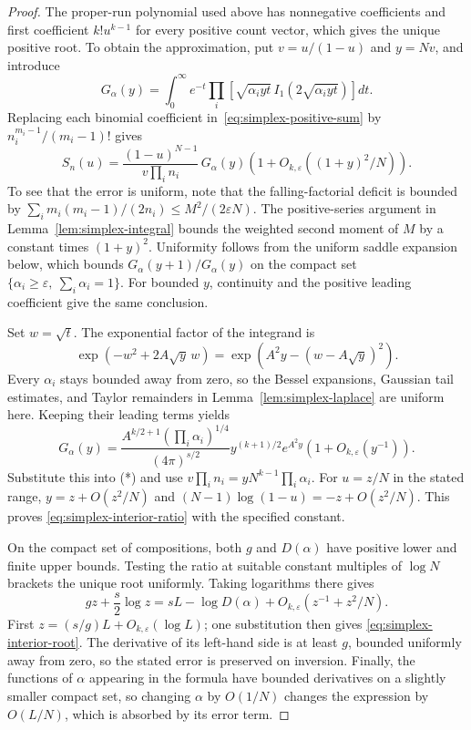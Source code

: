 \begin{proof}
The proper-run polynomial used above has nonnegative coefficients and
first coefficient $k!u^{k-1}$ for every positive count vector, which gives
the unique positive root. To obtain the approximation, put
$v=u/(1-u)$ and $y=Nv$, and introduce
\[
G_{\alpha}(y)=\int_0^\infty e^{-t}
\prod_i\left[\sqrt{\alpha_i y t}\,
I_1(2\sqrt{\alpha_i y t})\right]dt.
\]
Replacing each binomial coefficient in~\eqref{eq:simplex-positive-sum}
by $n_i^{m_i-1}/(m_i-1)!$ gives
\[
S_n(u)=\frac{(1-u)^{N-1}}{v\prod_i n_i}\,G_{\alpha}(y)
\left(1+O_{k,\varepsilon}((1+y)^2/N)\right).
\tag{*}
\]
To see that the error is uniform, note that the falling-factorial deficit
is bounded by
$\sum_i m_i(m_i-1)/(2n_i)\le M^2/(2\varepsilon N)$.
The positive-series argument in Lemma~\ref{lem:simplex-integral} bounds
the weighted second moment of $M$ by a constant times $(1+y)^2$.
Uniformity follows from the uniform saddle expansion below, which bounds
$G_{\alpha}(y+1)/G_{\alpha}(y)$ on the compact set
$\{\alpha_i\ge\varepsilon,\ \sum_i\alpha_i=1\}$. For bounded $y$,
continuity and the positive leading coefficient give the same conclusion.

Set $w=\sqrt t$. The exponential factor of the integrand is
\[
\exp(-w^2+2A\sqrt y\,w)
=\exp(A^2y-(w-A\sqrt y)^2).
\]
Every $\alpha_i$ stays bounded away from zero, so the Bessel expansions,
Gaussian tail estimates, and Taylor remainders in
Lemma~\ref{lem:simplex-laplace} are uniform here. Keeping their leading
terms yields
\[
G_{\alpha}(y)=
\frac{A^{k/2+1}(\prod_i\alpha_i)^{1/4}}{(4\pi)^{s/2}}
y^{(k+1)/2}e^{A^2y}\left(1+O_{k,\varepsilon}(y^{-1})\right).
\]
Substitute this into (*) and use
$v\prod_i n_i=yN^{k-1}\prod_i\alpha_i$.
For $u=z/N$ in the stated range, $y=z+O(z^2/N)$ and
$(N-1)\log(1-u)=-z+O(z^2/N)$. This proves
\eqref{eq:simplex-interior-ratio} with the specified constant.

On the compact set of compositions, both $g$ and $D(\alpha)$ have positive
lower and finite upper bounds. Testing the ratio at suitable constant
multiples of $\log N$ brackets the unique root uniformly. Taking logarithms
there gives
\[
gz+\frac{s}{2}\log z=sL-\log D(\alpha)
+O_{k,\varepsilon}(z^{-1}+z^2/N).
\]
First $z=(s/g)L+O_{k,\varepsilon}(\log L)$; one substitution then gives
\eqref{eq:simplex-interior-root}. The derivative of its left-hand side is
at least $g$, bounded uniformly away from zero, so the stated error is
preserved on inversion. Finally, the functions of $\alpha$ appearing in
the formula have bounded derivatives on a slightly smaller compact set, so
changing $\alpha$ by $O(1/N)$ changes the expression by $O(L/N)$, which
is absorbed by its error term.
\end{proof}

